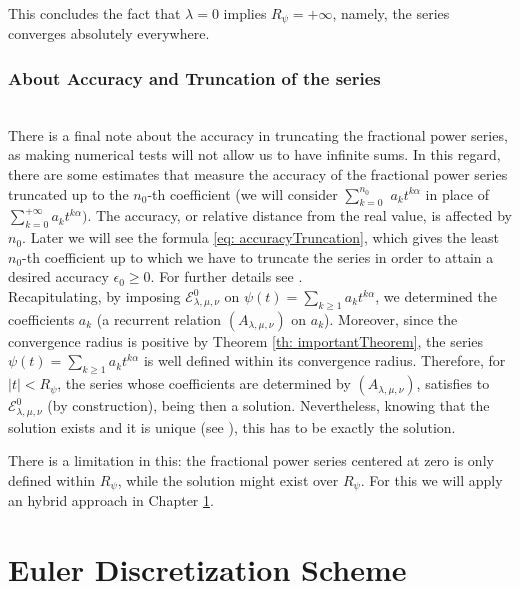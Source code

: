\documentclass[a4paper,italian,11pt]{book}
\theoremstyle{plain}
\theoremstyle{remark}
\theoremstyle{plain}
\begin{document}
This concludes the fact that $\lambda = 0$ implies $R_\psi = +\infty$, namely, the series converges absolutely everywhere.

\subsection{About Accuracy and Truncation of the series}
\\
There is a final note about the accuracy in truncating the fractional power series, as making numerical tests will not allow us to have infinite sums. 
In this regard, there are some estimates that measure the accuracy of the fractional power series truncated up to the $n_0$-th coefficient (we will consider $\sum_{k=0}^{n_0}$ $a_kt^{k\alpha}$ in place of $\sum_{k=0}^{+\infty} a_kt^{k\alpha})$. 
The accuracy, or relative distance from the real value, is affected by $n_0$. Later we will see the formula \eqref{eq: accuracyTruncation}, which gives the least $n_0$-th coefficient up to which we have to truncate the series in order to attain a desired accuracy $\epsilon_0 \ge 0 $. For further details see \cite{Main}. 
\\

Recapitulating, by imposing $\mathcal{E}^0_{\lambda, \mu, \nu}$ on $\psi(t)= \sum_{k\ge 1} a_k t^{k\alpha}$, we determined the coefficients $a_k$ (a recurrent relation $(A_{\lambda, \mu,\nu})$ on $a_k$). 
Moreover, since the convergence radius is positive by Theorem \ref{th: importantTheorem}, the series $\psi(t)= \sum_{k\ge 1} a_k t^{k\alpha}$ is well defined within its convergence radius. 
Therefore, for $|t|<R_\psi$, the series whose coefficients are determined by $(A_{\lambda, \mu,\nu})$, satisfies to $\mathcal{E}^0_{\lambda, \mu, \nu}$ (by construction), being then a solution.
Nevertheless, knowing that the solution exists and it is unique (see \cite{Omar}), this has to be exactly the solution.

There is a limitation in this: the fractional power series centered at zero is only defined within $R_\psi$, while the solution might exist over $R_\psi$. For this we will apply an hybrid approach in Chapter \ref{chapter: eulerDiscretizationScheme}.


\chapter{Euler Discretization Scheme}
\label{chapter: eulerDiscretizationScheme}
\end{document}
